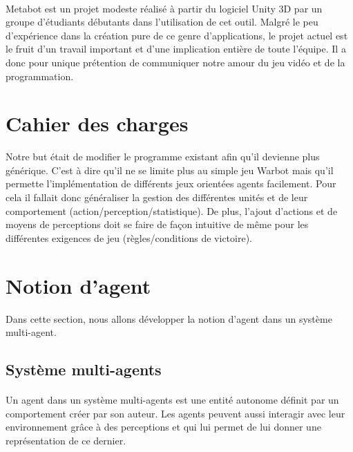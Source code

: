 \documentclass{report}
\begin{document}
\paragraph{}
Metabot est un projet modeste réalisé à partir du logiciel Unity 3D par un groupe d'étudiants débutants dans l'utilisation de cet outil. Malgré le peu d'expérience dans la création pure de ce genre d'applications, le projet actuel est le fruit d'un travail important et d'une implication entière de toute l'équipe.
Il a donc pour unique prétention de communiquer notre amour du jeu vidéo et de la programmation.

\section{Cahier des charges}

Notre but était de modifier le programme existant afin qu'il devienne plus générique. C'est à dire qu'il ne se limite plus au simple jeu Warbot mais qu'il permette l'implémentation de différents jeux orientées agents facilement. 
Pour cela il fallait donc généraliser la gestion des différentes unités et de leur comportement (action/perception/statistique). De plus, l'ajout d'actions et de moyens de perceptions doit se faire de façon intuitive de même pour les différentes exigences de jeu (règles/conditions de victoire). 

\section{Notion d'agent}
Dans cette section, nous allons développer la notion d'agent dans un système multi-agent.
\subsection{Système multi-agents}
\paragraph{} Un agent dans un système multi-agents est une entité autonome définit par un comportement créer par son auteur. Les agents peuvent aussi interagir avec leur environnement grâce à des perceptions et qui lui permet de lui donner une représentation de ce dernier. 
\end{document}
